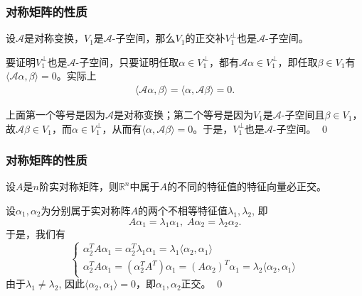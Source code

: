 \begin{frame}
\frametitle{对称矩阵的性质}

\begin{lem}
设$\mathscr{A}$是对称变换，$V_1$是$\mathscr{A}$-子空间，那么$V_1$的正交补$V_1^{\perp}$也是$\mathscr{A}$-子空间。
\end{lem}

\vspace{1em}
\pause

\startproof[bg=yellow, fg=red]
要证明$V_1^{\perp}$也是$\mathscr{A}$-子空间，只要证明任取$\alpha\in V_1^{\perp}$，都有$\mathscr{A}\alpha\in V_1^{\perp}$，即任取$\beta\in V_1$有$\langle \mathscr{A}\alpha, \beta \rangle = 0$。实际上
\begin{align*}
    \langle \mathscr{A}\alpha, \beta \rangle = \langle \alpha, \mathscr{A}\beta \rangle = 0.
\end{align*}

\pause

上面第一个等号是因为$\mathscr{A}$是对称变换；第二个等号是因为$V_1$是$\mathscr{A}$-子空间且$\beta\in V_1$，故$\mathscr{A}\beta \in V_1$，而$\alpha\in V_1^{\perp}$，从而有$\langle \alpha, \mathscr{A}\beta \rangle = 0$。于是，$V_1^{\perp}$也是$\mathscr{A}$-子空间。
\qed

\end{frame}


\begin{frame}
\frametitle{对称矩阵的性质}

\begin{lem}
设$A$是$n$阶实对称矩阵，则$\mathbb{R}^n$中属于$A$的不同的特征值的特征向量必正交。
\end{lem}

\vspace{0.5em}
\pause

\startproof[bg=yellow, fg=red]
设$\alpha_1, \alpha_2$为分别属于实对称阵$A$的两个不相等特征值$\lambda_1, \lambda_2$, 即
\[A\alpha_1 = \lambda_1\alpha_1, \; A\alpha_2 = \lambda_2\alpha_2.\]
于是，我们有
\[\begin{cases}
\alpha_2^T A\alpha_1 = \alpha_2^T\lambda_1\alpha_1 = \lambda_1 \langle \alpha_2, \alpha_1 \rangle \\
\alpha_2^T A\alpha_1 = (\alpha_2^T A^T)\alpha_1 = (A\alpha_2)^T\alpha_1 = \lambda_2 \langle \alpha_2, \alpha_1 \rangle
\end{cases}\]
由于$\lambda_1 \neq \lambda_2$, 因此$\langle \alpha_2, \alpha_1 \rangle = 0$，即$\alpha_1, \alpha_2$正交。
\qed

\end{frame}

